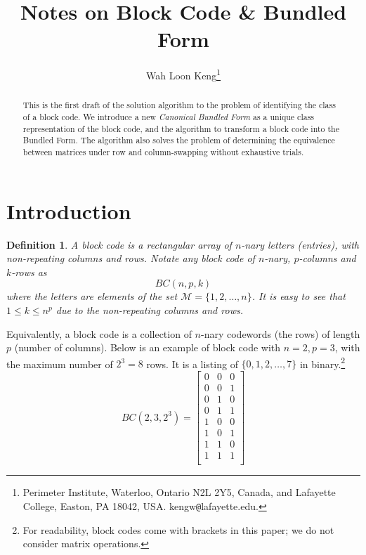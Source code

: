 \documentclass[12pt]{article}  %
\newtheorem{definition}{Definition}
\begin{document}
\title{Notes on Block Code \& Bundled Form}

\author{
{Wah Loon Keng}\thanks{
Perimeter Institute,
Waterloo, Ontario N2L 2Y5, Canada, and 
Lafayette College,
Easton, PA 18042, USA.
kengw{\tt @}lafayette.edu.}\\
}
\date{}
\maketitle

\begin{abstract}
This is the first draft of the solution algorithm to the problem of identifying the class of a block code. We introduce a new \emph{Canonical Bundled Form} as a unique class representation of the block code, and the algorithm to transform a block code into the Bundled Form. The algorithm also solves the problem of determining the equivalence between matrices under row and column-swapping without exhaustive trials.
\end{abstract}












\section{Introduction} \label{intro}
\begin{definition}
A block code is a rectangular array of $n$-nary letters (entries), with non-repeating columns and rows. Notate any block code of $n$-nary, $p$-columns and $k$-rows as 
$$BC(n,p,k)$$
where the letters are elements of the set $\mathcal{M}=\{1,2,\dots,n\}$. 
It is easy to see that $1\leq k \leq n^p$ due to the non-repeating columns and rows.
\end{definition}

Equivalently, a block code is a collection of $n$-nary codewords (the rows) of length $p$ (number of columns). Below is an example of block code with $n=2,p=3$, with the maximum number of $2^3=8$ rows. It is a listing of $\{0,1,2,\dots,7\}$ in binary.\footnote{For readability, block codes come with brackets in this paper; we do not consider matrix operations.}
$$BC(2,3,2^3)=
\left[\begin{array}{ccc}
0 & 0 & 0 \\
0 & 0 & 1 \\
0 & 1 & 0 \\
0 & 1 & 1 \\
1 & 0 & 0 \\
1 & 0 & 1 \\
1 & 1 & 0 \\
1 & 1 & 1 \\
\end{array}\right]
$$
\end{document}
